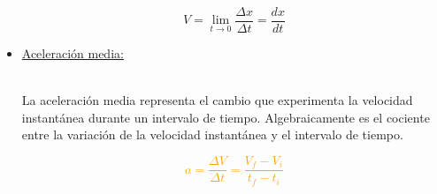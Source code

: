 \documentclass[letterpaper,12pt]{article}
\begin{document}
\begin{itemize}
{    $$V=\lim_{t \rightarrow 0}{\frac{\Delta x}{\Delta t}}=\frac{dx}{dt}$$ 
 
    }
    
    \item[\checkmark]\large{\underline{Aceleración media:}}\\\\
    \small{La aceleración media representa el cambio que experimenta la velocidad instantánea durante un intervalo de tiempo. Algebraicamente es el cociente entre la variación de la velocidad instantánea y el intervalo de tiempo.


    \textcolor{orange}{$$a=\frac{\Delta V}{\Delta t}=\frac{V_f-V_i}{t_f-t_i}$$} 
    
    }
 
 
\end{itemize}
\end{document}
